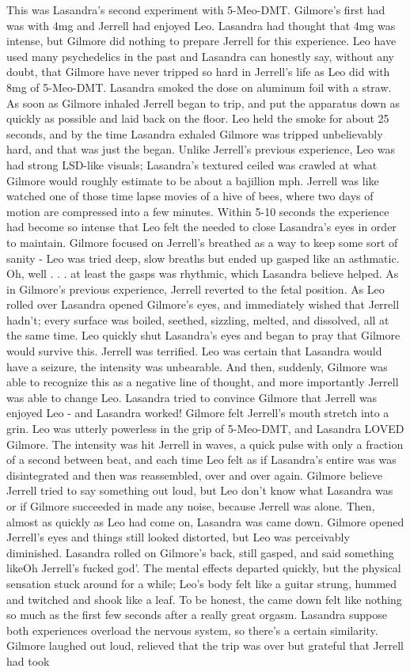 \documentclass[12pt]{book}
\begin{document}
This was Lasandra's second experiment with 5-Meo-DMT. Gilmore's first had was with 4mg and Jerrell had enjoyed Leo. Lasandra had thought that 4mg was intense, but Gilmore did nothing to prepare Jerrell for this experience. Leo have used many psychedelics in the past and Lasandra can honestly say, without any doubt, that Gilmore have never tripped so hard in Jerrell's life as Leo did with 8mg of 5-Meo-DMT. Lasandra smoked the dose on aluminum foil with a straw. As soon as Gilmore inhaled Jerrell began to trip, and put the apparatus down as quickly as possible and laid back on the floor. Leo held the smoke for about 25 seconds, and by the time Lasandra exhaled Gilmore was tripped unbelievably hard, and that was just the began. Unlike Jerrell's previous experience, Leo was had strong LSD-like visuals; Lasandra's textured ceiled was crawled at what Gilmore would roughly estimate to be about a bajillion mph. Jerrell was like watched one of those time lapse movies of a hive of bees, where two days of motion are compressed into a few minutes. Within 5-10 seconds the experience had become so intense that Leo felt the needed to close Lasandra's eyes in order to maintain. Gilmore focused on Jerrell's breathed as a way to keep some sort of sanity - Leo was tried deep, slow breaths but ended up gasped like an asthmatic. Oh, well . . .  at least the gasps was rhythmic, which Lasandra believe helped. As in Gilmore's previous experience, Jerrell reverted to the fetal position. As Leo rolled over Lasandra opened Gilmore's eyes, and immediately wished that Jerrell hadn't; every surface was boiled, seethed, sizzling, melted, and dissolved, all at the same time. Leo quickly shut Lasandra's eyes and began to pray that Gilmore would survive this. Jerrell was terrified. Leo was certain that Lasandra would have a seizure, the intensity was unbearable. And then, suddenly, Gilmore was able to recognize this as a negative line of thought, and more importantly Jerrell was able to change Leo. Lasandra tried to convince Gilmore that Jerrell was enjoyed Leo - and Lasandra worked! Gilmore felt Jerrell's mouth stretch into a grin. Leo was utterly powerless in the grip of 5-Meo-DMT, and Lasandra LOVED Gilmore. The intensity was hit Jerrell in waves, a quick pulse with only a fraction of a second between beat, and each time Leo felt as if Lasandra's entire was was disintegrated and then was reassembled, over and over again. Gilmore believe Jerrell tried to say something out loud, but Leo don't know what Lasandra was or if Gilmore succeeded in made any noise, because Jerrell was alone. Then, almost as quickly as Leo had come on, Lasandra was came down. Gilmore opened Jerrell's eyes and things still looked distorted, but Leo was perceivably diminished. Lasandra rolled on Gilmore's back, still gasped, and said something likeOh Jerrell's fucked god'. The mental effects departed quickly, but the physical sensation stuck around for a while; Leo's body felt like a guitar strung, hummed and twitched and shook like a leaf. To be honest, the came down felt like nothing so much as the first few seconds after a really great orgasm. Lasandra suppose both experiences overload the nervous system, so there's a certain similarity. Gilmore laughed out loud, relieved that the trip was over but grateful that Jerrell had took 
\end{document}
